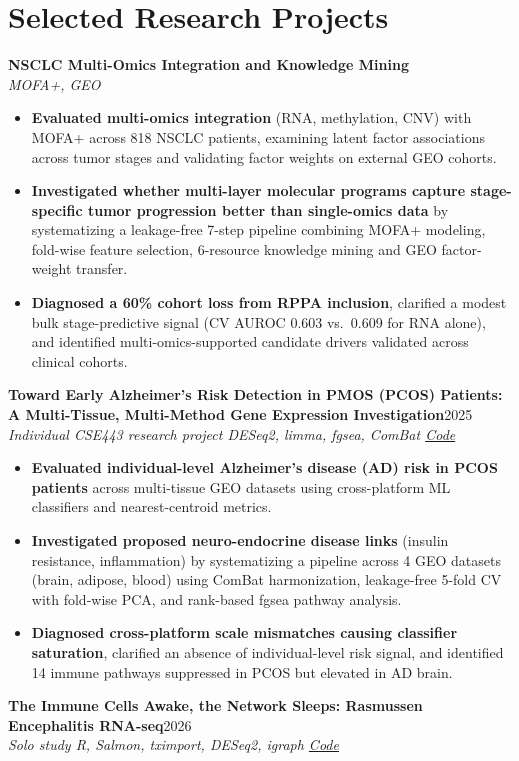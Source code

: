 \documentclass[10pt,letterpaper]{article}
\newcommand{\lnk}[2]{\href{#1}{\textcolor{link}{#2}}}
\newcommand{\proj}[3]{\needspace{4\baselineskip}\textbf{#1}\hfill #3\\ \textit{\small #2}\par}
\begin{document}
\section{Selected Research Projects}
\proj{NSCLC Multi-Omics Integration and Knowledge Mining}{MOFA+, GEO}{}
\begin{itemize}
  \item \textbf{Evaluated multi-omics integration} (RNA, methylation, CNV) with MOFA+ across 818 NSCLC patients, examining latent factor associations across tumor stages and validating factor weights on external GEO cohorts.
  \item \textbf{Investigated whether multi-layer molecular programs capture stage-specific tumor progression better than single-omics data} by systematizing a leakage-free 7-step pipeline combining MOFA+ modeling, fold-wise feature selection, 6-resource knowledge mining and GEO factor-weight transfer.
  \item \textbf{Diagnosed a 60\% cohort loss from RPPA inclusion}, clarified a modest bulk stage-predictive signal (CV AUROC 0.603 vs.\ 0.609 for RNA alone), and identified multi-omics-supported candidate drivers validated across clinical cohorts.
\end{itemize}
\proj{Toward Early Alzheimer's Risk Detection in PMOS (PCOS) Patients: A Multi-Tissue, Multi-Method Gene Expression Investigation}{Individual CSE443 research project \textbar{} DESeq2, limma, fgsea, ComBat \textbar{} \lnk{https://github.com/rozakter18/PCOS-AD-Transcriptomic-Investigation}{Code}}{2025}
\begin{itemize}
  \item \textbf{Evaluated individual-level Alzheimer's disease (AD) risk in PCOS patients} across multi-tissue GEO datasets using cross-platform ML classifiers and nearest-centroid metrics.
  \item \textbf{Investigated proposed neuro-endocrine disease links} (insulin resistance, inflammation) by systematizing a pipeline across 4 GEO datasets (brain, adipose, blood) using ComBat harmonization, leakage-free 5-fold CV with fold-wise PCA, and rank-based fgsea pathway analysis.
  \item \textbf{Diagnosed cross-platform scale mismatches causing classifier saturation}, clarified an absence of individual-level risk signal, and identified 14 immune pathways suppressed in PCOS but elevated in AD brain.
\end{itemize}
\proj{The Immune Cells Awake, the Network Sleeps: Rasmussen Encephalitis RNA-seq}{Solo study \textbar{} R, Salmon, tximport, DESeq2, igraph \textbar{} \lnk{https://github.com/rozakter18/Rasmussen-Encephalitis-RNAseq}{Code}}{2026}
\end{document}
